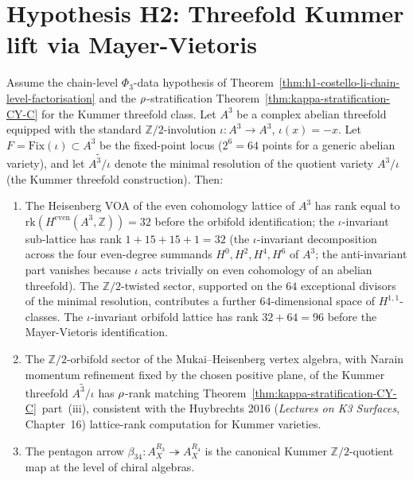 \section{Hypothesis H2: Threefold Kummer lift via Mayer-Vietoris}
\label{sec:h2-threefold-kummer}

\begin{theorem}
\label{thm:h2-threefold-kummer-lift}
Assume the chain-level $\Phi_3$-data hypothesis of
Theorem~\ref{thm:h1-costello-li-chain-level-factorisation} and the
$\rho$-stratification
Theorem~\ref{thm:kappa-stratification-CY-C} for the Kummer threefold class.
Let $A^3$ be a complex abelian threefold equipped with the standard
$\mathbb{Z}/2$-involution $\iota: A^3 \to A^3$, $\iota(x) = -x$. Let $F =
\mathrm{Fix}(\iota) \subset A^3$ be the fixed-point locus ($2^6 = 64$ points
for a generic abelian variety), and let $\widetilde{A^3/\iota}$ denote the
minimal resolution of the quotient variety $A^3/\iota$ (the Kummer threefold
construction). Then:
\begin{enumerate}[label=\textup{(\roman*)}]
 \item The Heisenberg VOA of the even cohomology lattice of $A^3$ has rank
 equal to $\mathrm{rk}(H^{\mathrm{even}}(A^3, \mathbb{Z})) = 32$ before
 the orbifold identification; the $\iota$-invariant sub-lattice has
 rank $1 + 15 + 15 + 1 = 32$ (the $\iota$-invariant decomposition
 across the four even-degree summands $H^{0}, H^{2}, H^{4}, H^{6}$
 of $A^3$; the anti-invariant part vanishes because $\iota$ acts
 trivially on even cohomology of an abelian threefold). The $\mathbb{Z}/2$-twisted sector, supported on
 the $64$ exceptional divisors of the minimal resolution, contributes
 a further $64$-dimensional space of $H^{1,1}$-classes. The
 $\iota$-invariant orbifold lattice has rank $32 + 64 = 96$ before
 the Mayer-Vietoris identification.
 \item The $\mathbb{Z}/2$-orbifold sector of the Mukai--Heisenberg
 vertex algebra, with Narain momentum refinement fixed by the chosen
 positive plane, of the Kummer threefold $\widetilde{A^3/\iota}$ has
 $\rho$-rank matching
 Theorem~\ref{thm:kappa-stratification-CY-C}~part~(iii), consistent
 with the Huybrechts 2016 (\emph{Lectures on K3 Surfaces}, Chapter~16)
 lattice-rank computation for Kummer varieties.
 \item The pentagon arrow $\beta_{34}: A_X^{R_3} \twoheadrightarrow A_X^{R_4}$
 is the canonical Kummer $\mathbb{Z}/2$-quotient map at the level of
 chiral algebras.
\end{enumerate}
\end{theorem}

